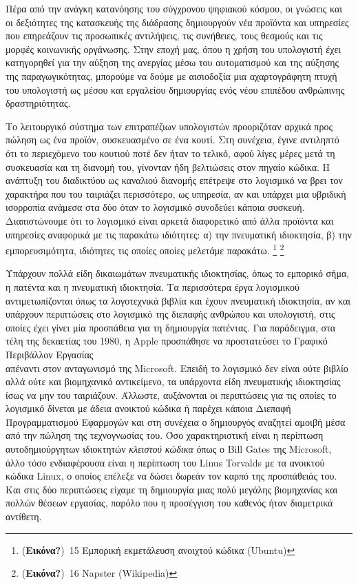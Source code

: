\documentclass[
]{article}
\begin{document}
Πέρα από την ανάγκη κατανόησης του σύγχρονου ψηφιακού κόσμου, οι γνώσεις
και οι δεξιότητες της κατασκευής της διάδρασης δημιουργούν νέα προϊόντα
και υπηρεσίες που επηρεάζουν τις προσωπικές αντιλήψεις, τις συνήθειες,
τους θεσμούς και τις μορφές κοινωνικής οργάνωσης. Στην εποχή μας, όπου η
χρήση του υπολογιστή έχει κατηγορηθεί για την αύξηση της ανεργίας μέσω
του αυτοματισμού και της αύξησης της παραγωγικότητας, μπορούμε να δούμε
με αισιοδοξία μια αχαρτογράφητη πτυχή του υπολογιστή ως μέσου και
εργαλείου δημιουργίας ενός νέου επιπέδου ανθρώπινης δραστηριότητας.

Το λειτουργικό σύστημα των επιτραπέζιων υπολογιστών προοριζόταν αρχικά
προς πώληση ως ένα προϊόν, συσκευασμένο σε ένα κουτί. Στη συνέχεια,
έγινε αντιληπτό ότι το περιεχόμενο του κουτιού ποτέ δεν ήταν το τελικό,
αφού λίγες μέρες μετά τη συσκευασία και τη διανομή του, γίνονταν ήδη
βελτιώσεις στον πηγαίο κώδικα. Η ανάπτυξη του διαδικτύου ως καναλιού
διανομής επέτρεψε στο λογισμικό να βρει τον χαρακτήρα που του ταιριάζει
περισσότερο, ως υπηρεσία, αν και υπάρχει μια υβριδική ισορροπία ανάμεσα
στα δύο όταν το λογισμικό συνοδεύει κάποια συσκευή. Διαπιστώνουμε ότι το
λογισμικό είναι αρκετά διαφορετικό από άλλα προϊόντα και υπηρεσίες
αναφορικά με τις παρακάτω ιδιότητες: α) την πνευματική ιδιοκτησία, β)
την εμπορευσιμότητα, ιδιότητες τις οποίες οποίες μελετάμε παρακάτω.
\footnote{(\textbf{Εικόνα?})~15 Εμπορική εκμετάλευση ανοιχτού κώδικα
  (Ubuntu)} \footnote{(\textbf{Εικόνα?})~16 Napster (Wikipedia)}

Υπάρχουν πολλά είδη δικαιωμάτων πνευματικής ιδιοκτησίας, όπως το
εμπορικό σήμα, η πατέντα και η πνευματική ιδιοκτησία. Τα περισσότερα
έργα λογισμικού αντιμετωπίζονται όπως τα λογοτεχνικά βιβλία και έχουν
πνευματική ιδιοκτησία, αν και υπάρχουν περιπτώσεις στο λογισμικό της
διεπαφής ανθρώπου και υπολογιστή, στις οποίες έχει γίνει μία προσπάθεια
για τη δημιουργία πατέντας. Για παράδειγμα, στα τέλη της δεκαετίας του
1980, η Apple προσπάθησε να προστατεύσει το Γραφικό Περιβάλλον
Εργασίας\\
απέναντι στον ανταγωνισμό της Microsoft. Επειδή το λογισμικό δεν είναι
ούτε βιβλίο αλλά ούτε και βιομηχανικό αντικείμενο, τα υπάρχοντα είδη
πνευματικής ιδιοκτησίας ίσως να μην του ταιριάζουν. Άλλωστε, αυξάνονται
οι περιπτώσεις για τις οποίες το λογισμικό δίνεται με άδεια ανοικτού
κώδικα ή παρέχει κάποια Διεπαφή Προγραμματισμού Εφαρμογών και στη
συνέχεια ο δημιουργός αναζητεί αμοιβή μέσα από την πώληση της
τεχνογνωσίας του. Όσο χαρακτηριστική είναι η περίπτωση αυτοδημιούργητων
ιδιοκτητών \emph{κλειστού κώδικα} όπως ο Bill Gates της Microsoft, άλλο
τόσο ενδιαφέρουσα είναι η περίπτωση του Linus Torvalds με τα ανοικτού
κώδικα Linux, ο οποίος επέλεξε να δώσει δωρεάν τον καρπό της προσπάθειάς
του. Και στις δύο περιπτώσεις είχαμε τη δημιουργία μιας πολύ μεγάλης
βιομηχανίας και πολλών θέσεων εργασίας, παρόλο που η προσέγγιση του
καθενός ήταν διαμετρικά αντίθετη.
\end{document}
